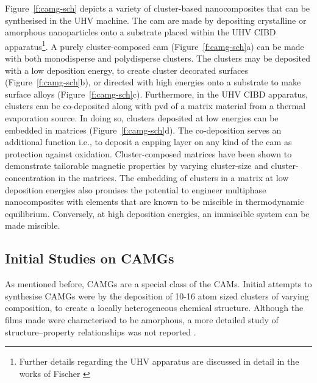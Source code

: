 Figure~\ref{f:camg-sch} depicts a variety of cluster-based nanocomposites that can be synthesised in the UHV machine. The \gls{cam} are made by depositing crystalline or amorphous nanoparticles onto a substrate placed within the UHV CIBD apparatus\footnote{Further details regarding the UHV apparatus are discussed in detail in the works of Fischer \cite{Fischer2015,Fischer2015a}}. A purely cluster-composed \gls{cam} (Figure~\ref{f:camg-sch}a) can be made with both monodisperse and polydisperse clusters. The clusters may be deposited with a low deposition energy, to create cluster decorated surfaces (Figure~\ref{f:camg-sch}b), or directed with high energies onto a substrate to make surface alloys (Figure~\ref{f:camg-sch}c). Furthermore, in the UHV CIBD apparatus, clusters 
can be co-deposited along with \gls{pvd} of a matrix material from a thermal evaporation source. In doing so, clusters deposited at low energies can be embedded in matrices (Figure~\ref{f:camg-sch}d). The co-deposition serves an additional function i.e., to deposit a capping layer on any kind of the \gls{cam} as protection against oxidation. Cluster-composed matrices \cite{Fischer2015a,Benel2018,Gack2020} have been shown to demonstrate tailorable magnetic properties by varying cluster-size and cluster-concentration in the matrices. The embedding of clusters in a matrix at low deposition energies also promises the potential to engineer multiphase nanocomposites with elements that are known to be miscible in thermodynamic 
equilibrium. Conversely, at high deposition energies, an immiscible system can be made miscible. \par


\subsection{Initial Studies on CAMGs}
As mentioned before, CAMGs are a special class of the CAMs. Initial attempts to synthesise CAMGs were by the deposition of 10-16 atom sized clusters of varying composition, to create a locally heterogeneous chemical structure. Although the films made were characterised to be amorphous, a more detailed study of structure–property relationships was not reported 
\cite{Kartouzian2013,Kartouzian2014}. \par

